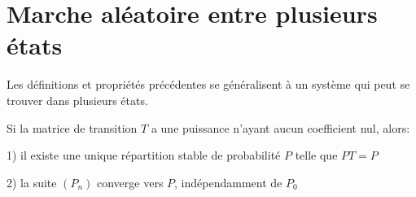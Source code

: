 \documentclass[french]{book}
\begin{document}
\section{Marche aléatoire entre plusieurs états}
 
  Les définitions et propriétés précédentes se généralisent à un système qui peut se trouver dans plusieurs états.
  
\begin{thm}
 
 Si la matrice de transition $T$ a une puissance n'ayant aucun coefficient nul, alors:
 
 1) il existe une unique répartition stable de probabilité $P$ telle que $PT=P$
   
      
   2) la suite $(P_{n})$ converge vers $P$, indépendamment   de $P_{0}$ \end{thm}
\end{document}
